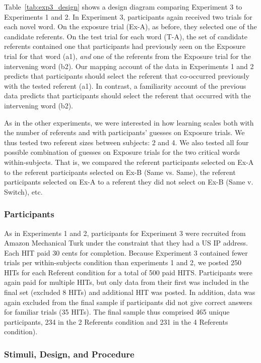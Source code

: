 \documentclass[man,floatsintext]{apa6}
\begin{document}
Table~\ref{tab:exp3_design} shows a design diagram comparing Experiment 3 to Experiments 1 and 2. In Experiment 3, participants again received two trials for each novel word. On the exposure trial (Ex-A), as before, they selected one of the candidate referents. On the test trial for each word (T-A), the set of candidate referents contained one that participants had previously seen on the Exposure trial for that word (a1), \emph{and} one of the referents from the Exposure trial for the intervening word (b2). Our mapping account of the data in Experiments 1 and 2 predicts that participants should select the referent that co-occurred previously with the tested referent (a1). In contrast, a familiarity account of the previous data predicts that participants should select the referent that occurred with the intervening word (b2).

As in the other experiments, we were interested in how learning scales both with the number of referents and with participants' guesses on Exposure trials. We thus tested two referent sizes between subjects: 2 and 4. We also tested all four possible combination of guesses on Exposure trials for the two critical words within-subjects. That is, we compared the referent participants selected on Ex-A to the referent participants selected on Ex-B (Same vs. Same), the referent participants selected on Ex-A to a referent they did not select on Ex-B (Same v. Switch), etc. 

\subsubsection{Participants}

As in Experiments 1 and 2, participants for Experiment 3 were recruited from Amazon Mechanical Turk under the constraint that they had a US IP address. Each HIT paid 30 cents for completion. Because Experiment 3 contained fewer trials per within-subjects condition than experiments 1 and 2, we posted 250 HITs for each Referent condition for a total of 500 paid HITS. Participants were again paid for multiple HITs, but only data from their first was included in the final set (excluded 8 HITs) and additional HIT was posted. In addition, data was again excluded from the final sample if participants did not give correct answers for familiar trials (35 HITs). The final sample thus comprised 465 unique participants, 234 in the 2 Referents condition and 231 in the 4 Referents condition).

\subsubsection{Stimuli, Design, and Procedure}
\end{document}
